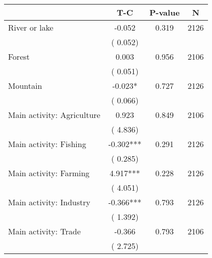 
\begin{tabular}{l*{3}{c}}\hline&\multicolumn{1}{c}{T-C}&\multicolumn{1}{c}{P-value}&\multicolumn{1}{c}{N} \\ \hline
 River or lake                 &             -0.052          &        0.319 & 2126          \\ 
                               &        (       0.052)             &                        &                              \\ 
 Forest                 &              0.003          &        0.956 & 2106          \\ 
                               &        (       0.051)             &                        &                              \\ 
 Mountain                 &             -0.023*          &        0.727 & 2126          \\ 
                               &        (       0.066)             &                        &                              \\ 
 Main activity: Agriculture                  &              0.923          &        0.849 & 2106          \\ 
                               &        (       4.836)             &                        &                              \\ 
 Main activity: Fishing                 &             -0.302***          &        0.291 & 2126          \\ 
                               &        (       0.285)             &                        &                              \\ 
 Main activity: Farming                 &              4.917***          &        0.228 & 2126          \\ 
                               &        (       4.051)             &                        &                              \\ 
 Main activity: Industry                 &             -0.366***          &        0.793 & 2126          \\ 
                               &        (       1.392)             &                        &                              \\ 
 Main activity: Trade                 &             -0.366          &        0.793 & 2106          \\ 
                               &        (       2.725)             &                        &                              \\ 

\end{tabular}
